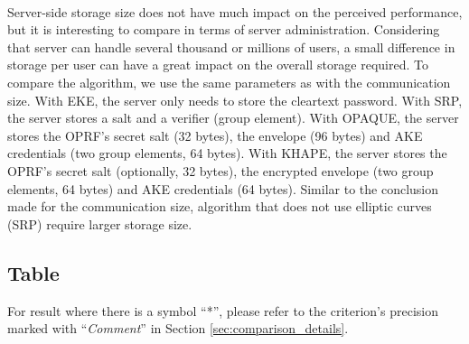 ﻿\documentclass[../report.tex]{subfiles}
\begin{document}
\paragraph{}
Server-side storage size does not have much impact on the perceived performance, but it is interesting to compare in terms of server administration. Considering that server can handle several thousand or millions of users, a small difference in storage per user can have a great impact on the overall storage required.
To compare the algorithm, we use the same parameters as with the communication size.
With EKE, the server only needs to store the cleartext password.
With SRP, the server stores a salt and a verifier (group element).
With OPAQUE, the server stores the OPRF's secret salt (32 bytes), the envelope (96 bytes) and AKE credentials (two group elements, 64 bytes).
With KHAPE, the server stores the OPRF's secret salt (optionally, 32 bytes), the encrypted envelope (two group elements, 64 bytes) and AKE credentials (64 bytes).
Similar to the conclusion made for the communication size, algorithm that does not use elliptic curves (SRP) require larger storage size.

% 
% 


\subsection{Table} \label{sec:comparison_table}
For result where there is a symbol ``*'', please refer to the criterion's precision marked with ``\emph{Comment}'' in Section \ref{sec:comparison_details}.
\end{document}
